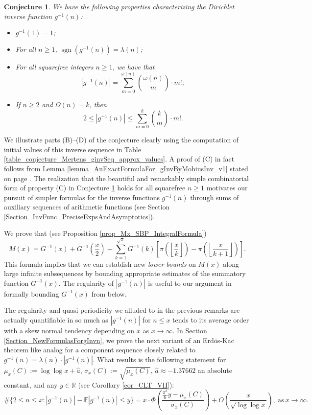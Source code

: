 \documentclass[11pt,reqno,a4letter]{article}
\numberwithin{figure}{section}
\numberwithin{table}{section}
\newcommand{\Floor}[2]{\ensuremath{\left\lfloor \frac{#1}{#2} \right\rfloor}}
\theoremstyle{plain}
\newtheorem{conjecture}[theorem]{Conjecture}
\numberwithin{theorem}{section}
\theoremstyle{definition}
\newcommand{\NBRef}[1]{}
\begin{document}
\NBRef{A01-2020-04-26}
\begin{conjecture}
\label{lemma_gInv_MxExample} 
We have the following properties characterizing the 
Dirichlet inverse function $g^{-1}(n)$: 
\begin{itemize} 

\item[\textbf{(A)}] $g^{-1}(1) = 1$; 
\item[\textbf{(B)}] For all $n \geq 1$, $\operatorname{sgn}(g^{-1}(n)) = \lambda(n)$; 
\item[\textbf{(C)}] For all squarefree integers $n \geq 1$, we have that 
     \[
     |g^{-1}(n)| = \sum_{m=0}^{\omega(n)} \binom{\omega(n)}{m} \cdot m!; 
     \]
\item[\textbf{(D)}] If $n \geq 2$ and $\Omega(n) = k$, then 
     \[
     2 \leq |g^{-1}(n)| \leq \sum_{m=0}^{k} \binom{k}{m} \cdot m!. 
     \]
\end{itemize} 
\end{conjecture} 

We illustrate parts (B)--(D) of the conjecture clearly using the computation of initial values of 
this inverse sequence in 
Table \ref{table_conjecture_Mertens_ginvSeq_approx_values}. 
A proof of (C) in fact follows from 
Lemma \ref{lemma_AnExactFormulaFor_gInvByMobiusInv_v1} 
stated on page \pageref{lemma_AnExactFormulaFor_gInvByMobiusInv_v1}. 
The realization that the beautiful and remarkably simple combinatorial form of property (C) 
in Conjecture \ref{lemma_gInv_MxExample} holds for all squarefree $n \geq 1$ 
motivates our pursuit of simpler formulas for the inverse functions $g^{-1}(n)$ 
through sums of auxiliary sequences of arithmetic functions 
(see Section \ref{Section_InvFunc_PreciseExpsAndAsymptotics}). 

We prove that (see Proposition \ref{prop_Mx_SBP_IntegralFormula}) 
\[
M(x) = G^{-1}(x) + G^{-1}\left(\frac{x}{2}\right) - 
     \sum_{k=1}^{\sqrt{x}} G^{-1}(k) \left[ 
     \pi\left(\Floor{x}{k}\right) - \pi\left(\Floor{x}{k+1}\right) 
     \right]. 
\]
This formula 
implies that we can establish new \emph{lower bounds} on $M(x)$ along large infinite subsequences 
by bounding appropriate estimates of the summatory function $G^{-1}(x)$. 
The regularity of $|g^{-1}(n)|$ is useful to our argument in formally bounding $G^{-1}(x)$ from
below. 

The regularity and quasi-periodicity we alluded to in the previous remarks are actually 
quantifiable in so much as $|g^{-1}(n)|$ for $n \leq x$ 
tends to its average order with a skew normal tendency 
depending on $x$ as $x \rightarrow \infty$. 
In Section \ref{Section_NewFormulasForgInvn}, 
we prove the next variant of an Erd\"os-Kac theorem like analog
for a component sequence closely related to $g^{-1}(n) = \lambda(n) \cdot |g^{-1}(n)|$. 
What results is the following statement for 
$\mu_x(C) := \log\log x + \hat{a}$, $\sigma_x(C) := \sqrt{\mu_x(C)}$, 
$\hat{a} \approx -1.37662$ an absolute constant, and any $y \in \mathbb{R}$ (see 
Corollary \ref{cor_CLT_VII}): 
\[
\#\{2 \leq n \leq x: |g^{-1}(n)| - \mathbb{E}|g^{-1}(n)| \leq y\} = 
     x \cdot \Phi\left(\frac{\frac{\pi^2}{6}y - \mu_x(C)}{\sigma_x(C)}\right) + 
     O\left(\frac{x}{\sqrt{\log\log x}}\right), 
     \mathrm{\ as\ } x \rightarrow \infty. 
\]
\end{document}

